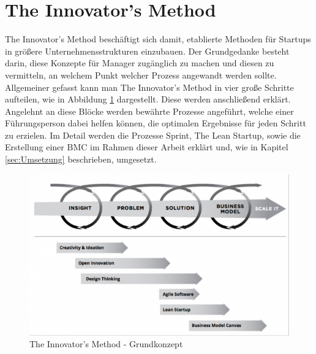 \section{The Innovator's Method}
\label{sec:TheInnovatorsMethod}
The Innovator's Method beschäftigt sich damit, etablierte Methoden für Startups in größere Unternehmensstrukturen einzubauen. Der Grundgedanke besteht darin, diese Konzepte für Manager zugänglich zu machen und diesen zu vermitteln, an welchem Punkt welcher Prozess angewandt werden sollte. Allgemeiner gefasst kann man The Innovator's Method in vier große Schritte aufteilen, wie in Abbildung \ref{fig:TheInnovatorsMethod} dargestellt. Diese werden anschließend erklärt. Angelehnt an diese Blöcke werden bewährte Prozesse angeführt, welche einer Führungsperson dabei helfen können, die optimalen Ergebnisse für jeden Schritt zu erzielen.
Im Detail werden die Prozesse Sprint, The Lean Startup, sowie die Erstellung einer \ac{BMC} im Rahmen dieser Arbeit erklärt und, wie in Kapitel \ref{sec:Umsetzung} beschrieben, umgesetzt.

\begin{figure}[h!]
	\begin{center}
		\includegraphics[width=\textwidth]{99_IMG/02_Grundlagen/innovatorsMethod.png}
		\caption[The Innovator's Method - Grundkonzept]{The Innovator's Method - Grundkonzept\cite{TheInnovatorsMethod}}
		\label{fig:TheInnovatorsMethod}
	\end{center}
\end{figure}


